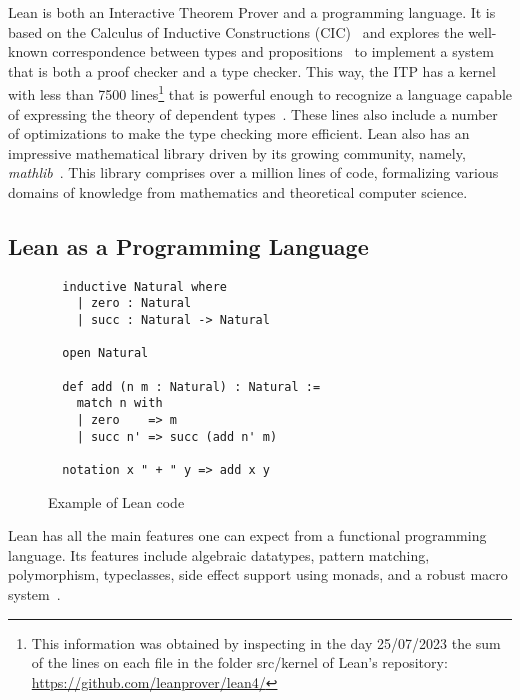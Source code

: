 
Lean is both an Interactive Theorem Prover and a programming
language. It is based on the Calculus of Inductive Constructions (CIC)~\cite{cic_ref} and explores the well-known correspondence between types and propositions~\cite{ch_correspondence} to implement a system that is both a proof checker and a type checker. This way, the ITP has a kernel with less than 7500 lines\footnote{This information was obtained by inspecting in the day 25/07/2023 the sum of the lines on each file in the folder src/kernel of Lean's repository: \url{https://github.com/leanprover/lean4/}} that is powerful enough to recognize a language capable of expressing the theory of dependent types~\cite{dep_type_theory}. These lines also include a number of optimizations to make the type checking more efficient. Lean also has an impressive mathematical library driven by its growing community, namely, \textit{mathlib}~\cite{mathlib}.
This library comprises over a million lines of code, formalizing various domains of knowledge from mathematics and theoretical computer science.

\subsection{Lean as a Programming Language}


\begin{figure}[t]
\begin{verbatim}
  inductive Natural where
    | zero : Natural
    | succ : Natural -> Natural

  open Natural

  def add (n m : Natural) : Natural :=
    match n with
    | zero    => m
    | succ n' => succ (add n' m)

  notation x " + " y => add x y
\end{verbatim}
\caption{Example of Lean code}\label{leanAdd}
\end{figure}

Lean has all the main features one can expect from a functional programming language. Its features include algebraic datatypes, pattern matching, polymorphism, typeclasses, side effect support using monads, and a robust macro system~\cite{lean4_ref}.

